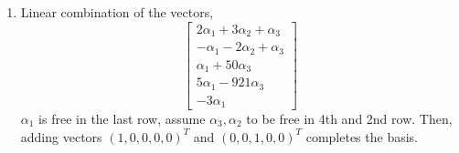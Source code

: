 \documentclass{article}
\begin{document}
\begin{enumerate}[label=\textbf{5.\arabic*.}]
    \item Linear combination of the vectors,
    $$\left[\begin{matrix}2\alpha_1+3\alpha_2+\alpha_3\\
    -\alpha_1-2\alpha_2+\alpha_3\\
    \alpha_1+50\alpha_3\\
    5\alpha_1-921\alpha_3\\
    -3\alpha_1\end{matrix}\right]$$
    $\alpha_1$ is free in the last row, assume $\alpha_3, \alpha_2$ to be free
    in 4th and 2nd row. Then, adding vectors $(1,0,0,0,0)^T$ and $(0,0,1,0,0)^T$
    completes the basis.
\end{enumerate}
\end{document}
